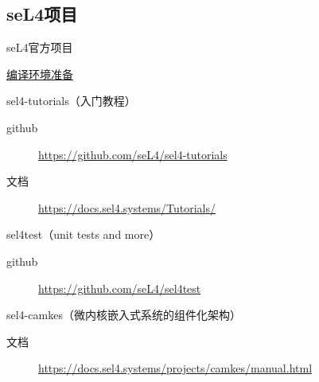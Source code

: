 \documentclass[presentation,dvipdfmx,CJKbookmarks]{beamer}
\begin{document}
\begin{CJK*}{UTF8}{simsun}
\section{seL4\thinspace 项目}
\label{sec:org6ed3ae4}
\begin{frame}[label={sec:org7ffb8e3}]{seL4\thinspace 官方项目}
\begin{block}{\href{https://docs.sel4.systems/projects/buildsystem/host-dependencies.html}{编译环境准备}}
\end{block}
\begin{block}{sel4-tutorials（入门教程）}
\begin{description}
\item[{github}] \url{https://github.com/seL4/sel4-tutorials}
\item[{文档}] \url{https://docs.sel4.systems/Tutorials/}
\end{description}
\end{block}
\begin{block}{sel4test（unit tests and more）}
\begin{description}
\item[{github}] \url{https://github.com/seL4/sel4test}
\end{description}
\end{block}

\begin{block}{sel4-camkes（微内核嵌入式系统的组件化架构）}
\begin{description}
\item[{文档}] \url{https://docs.sel4.systems/projects/camkes/manual.html}
\end{description}
\end{block}
\end{frame}


\end{CJK*}
\end{document}
